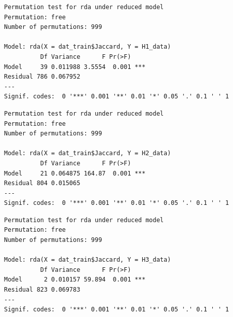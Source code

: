\documentclass[
  letterpaper,
  DIV=11,
  numbers=noendperiod]{scrreprt}
\newenvironment{Shaded}{\begin{snugshade}}{\end{snugshade}}
\newcommand{\CommentTok}[1]{\textcolor[rgb]{0.37,0.37,0.37}{#1}}
\newcommand{\FunctionTok}[1]{\textcolor[rgb]{0.28,0.35,0.67}{#1}}
\newcommand{\NormalTok}[1]{\textcolor[rgb]{0.00,0.23,0.31}{#1}}
\newcommand{\SpecialCharTok}[1]{\textcolor[rgb]{0.37,0.37,0.37}{#1}}
\begin{document}
\begin{Shaded}
\end{Shaded}

\begin{verbatim}
Permutation test for rda under reduced model
Permutation: free
Number of permutations: 999

Model: rda(X = dat_train$Jaccard, Y = H1_data)
          Df Variance      F Pr(>F)    
Model     39 0.011988 3.5554  0.001 ***
Residual 786 0.067952                  
---
Signif. codes:  0 '***' 0.001 '**' 0.01 '*' 0.05 '.' 0.1 ' ' 1
\end{verbatim}

\begin{Shaded}
\end{Shaded}

\begin{verbatim}
Permutation test for rda under reduced model
Permutation: free
Number of permutations: 999

Model: rda(X = dat_train$Jaccard, Y = H2_data)
          Df Variance      F Pr(>F)    
Model     21 0.064875 164.87  0.001 ***
Residual 804 0.015065                  
---
Signif. codes:  0 '***' 0.001 '**' 0.01 '*' 0.05 '.' 0.1 ' ' 1
\end{verbatim}

\begin{Shaded}
\end{Shaded}

\begin{verbatim}
Permutation test for rda under reduced model
Permutation: free
Number of permutations: 999

Model: rda(X = dat_train$Jaccard, Y = H3_data)
          Df Variance      F Pr(>F)    
Model      2 0.010157 59.894  0.001 ***
Residual 823 0.069783                  
---
Signif. codes:  0 '***' 0.001 '**' 0.01 '*' 0.05 '.' 0.1 ' ' 1
\end{verbatim}
\end{document}
